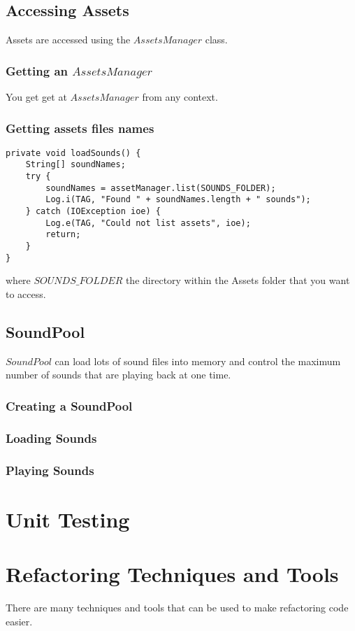 \documentclass[]{article}
\begin{document}
\subsection{Accessing Assets}
Assets are accessed using the $AssetsManager$ class.
\subsubsection{Getting an $AssetsManager$}
You get get at $AssetsManager$ from any context.

\subsubsection{Getting assets files names}
\begin{lstlisting}
private void loadSounds() {
	String[] soundNames;
	try {
		soundNames = assetManager.list(SOUNDS_FOLDER);
		Log.i(TAG, "Found " + soundNames.length + " sounds");
	} catch (IOException ioe) {
		Log.e(TAG, "Could not list assets", ioe);
		return;
	}
}
\end{lstlisting}
where $SOUNDS\_FOLDER$ the directory within the Assets folder that you want to access.

\subsection{SoundPool}
$SoundPool$ can load lots of sound files into memory and control the maximum number of sounds that are playing back at one time.
\subsubsection{Creating a SoundPool}

\subsubsection{Loading Sounds}

\subsubsection{Playing Sounds}


\section{Unit Testing}

\section{Refactoring Techniques and Tools}
There are many techniques and tools that can be used to make refactoring code easier.
\end{document}
